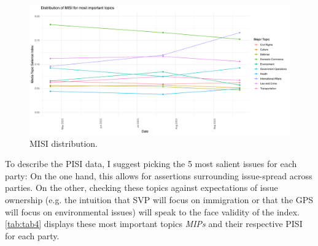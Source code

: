 \documentclass[11pt,a4paper]{article}
\begin{document}
\begin{figure}
    \centering
    \includegraphics[width=1\linewidth]{output/plots/plot_figure_5.png}
    \caption{MISI distribution.}
    \label{fig:fig5}
\end{figure}

To describe the PISI data, I suggest picking the 5 most salient issues for each party: On the one hand, this allows for assertions surrounding issue-spread across parties. On the other, checking these topics against expectations of issue ownership (e.g. the intuition that SVP will focus on immigration or that the GPS will focus on environmental issues) will speak to the face validity of the index. \autoref{tab:tab4} displays these most important topics \textit{MIPs} and their respective PISI for each party.
\end{document}
